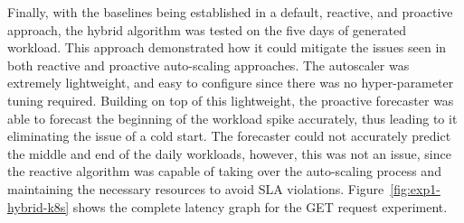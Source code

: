 \begin{center}
\begin{minipage}{\linewidth}
    \label{fig:exp1-hybrid-k8s}
\end{minipage}
\end{center}

Finally, with the baselines being established in a default, reactive, and proactive approach, the hybrid algorithm was tested on the five days of generated workload. This approach demonstrated how it could mitigate the issues seen in both reactive and proactive auto-scaling approaches. The autoscaler was extremely lightweight, and easy to configure since there was no hyper-parameter tuning required. Building on top of this lightweight, the proactive forecaster was able to forecast the beginning of the workload spike accurately, thus leading to it eliminating the issue of a cold start. The forecaster could not accurately predict the middle and end of the daily workloads, however, this was not an issue, since the reactive algorithm was capable of taking over the auto-scaling process and maintaining the necessary resources to avoid SLA violations. Figure~\ref{fig:exp1-hybrid-k8s} shows the complete latency graph for the GET request experiment.\par

